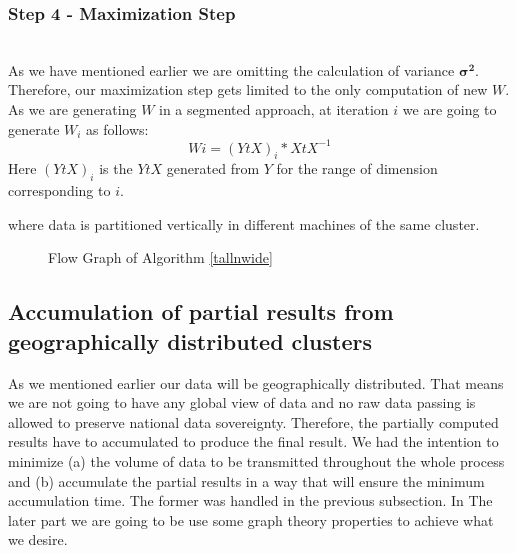 \documentclass[10pt,conference,letterpaper]{IEEEtran}
\begin{document}
\subsubsection{\textbf{Step 4 - Maximization Step}}\hspace*{\fill} \\
As we have mentioned earlier we are omitting the calculation of variance $\pmb{\sigma ^2}$. Therefore, our maximization step gets limited to the only computation of new $W$. As we are generating $W$ in a segmented approach, at iteration $i$ we are going to generate $W_i$ as follows:
\begin{equation*}
    Wi = (YtX)_i * XtX^{-1}
\end{equation*}
Here $(YtX)_i$ is the $YtX$ generated from $Y$ for the range of dimension corresponding to $i$.






where data is partitioned vertically in different machines of the same cluster. 

















\begin{figure}[!htbp]
\label{flow}
\centering
{}
\caption{Flow Graph of Algorithm \ref{tallnwide}}
\end{figure}

\subsection{Accumulation of partial results from geographically distributed clusters}
As we mentioned earlier our data will be geographically distributed. That means we are not going to have any global view of data and no raw data passing is allowed to preserve national data sovereignty. Therefore, the partially computed results have to accumulated to produce the final result. We had the intention to minimize (a) the volume of data to be transmitted throughout the whole process and (b) accumulate the partial results in a way that will ensure the minimum accumulation time.
The former was handled in the previous subsection. In The later part we are going to be use some graph theory properties to achieve what we desire.
\end{document}
